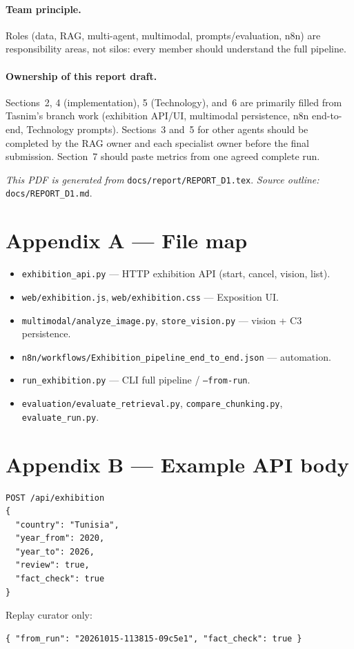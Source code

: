 \documentclass[11pt,a4paper]{article}
\begin{document}
\paragraph{Team principle.}
Roles (data, RAG, multi-agent, multimodal, prompts/evaluation, n8n) are responsibility areas, not silos: every member should understand the full pipeline.

\paragraph{Ownership of this report draft.}
Sections~2, 4 (implementation), 5 (Technology), and~6 are primarily filled from Tasnim's branch work (exhibition API/UI, multimodal persistence, n8n end-to-end, Technology prompts). Sections~3 and~5 for other agents should be completed by the RAG owner and each specialist owner before the final submission. Section~7 should paste metrics from one agreed complete run.

\vspace{1em}
\noindent\textit{This PDF is generated from} \texttt{docs/report/REPORT\_D1.tex}.
\textit{Source outline:} \texttt{docs/REPORT\_D1.md}.


\section*{Appendix A --- File map}
\begin{itemize}
  \item \texttt{exhibition\_api.py} --- HTTP exhibition API (start, cancel, vision, list).
  \item \texttt{web/exhibition.js}, \texttt{web/exhibition.css} --- Exposition UI.
  \item \texttt{multimodal/analyze\_image.py}, \texttt{store\_vision.py} --- vision + C3 persistence.
  \item \texttt{n8n/workflows/Exhibition\_pipeline\_end\_to\_end.json} --- automation.
  \item \texttt{run\_exhibition.py} --- CLI full pipeline / \texttt{--from-run}.
  \item \texttt{evaluation/evaluate\_retrieval.py}, \texttt{compare\_chunking.py}, \texttt{evaluate\_run.py}.
\end{itemize}

\section*{Appendix B --- Example API body}
\begin{verbatim}
POST /api/exhibition
{
  "country": "Tunisia",
  "year_from": 2020,
  "year_to": 2026,
  "review": true,
  "fact_check": true
}
\end{verbatim}
Replay curator only:
\begin{verbatim}
{ "from_run": "20261015-113815-09c5e1", "fact_check": true }
\end{verbatim}
\end{document}
